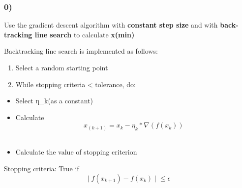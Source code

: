 \documentclass[
  letterpaper,
  DIV=11,
  numbers=noendperiod]{scrartcl}
\providecommand{\tightlist}{%
  \setlength{\itemsep}{0pt}\setlength{\parskip}{0pt}}\usepackage{longtable,booktabs,array}
\begin{document}
\subsubsection{0)}\label{section}

Use the gradient descent algorithm with \textbf{constant step size} and
with \textbf{back-tracking line search} to calculate \textbf{x(min)}

Backtracking line search is implemented as follows:

\begin{enumerate}
\def\labelenumi{\arabic{enumi}.}
\tightlist
\item
  Select a random starting point\\
\item
  While stopping criteria \textless{} tolerance, do:
\end{enumerate}

\begin{itemize}
\tightlist
\item
  Select η\_k(as a constant)\\
\item
  Calculate \[ x_{(k+1)} = x_k - η_k * ∇(f(x_k)) \]\\
\item
  Calculate the value of stopping criterion
\end{itemize}

Stopping criteria: True if \[ ∣f(x_{k+1}) − f(x_{k})∣ ≤ ϵ \]
\end{document}
